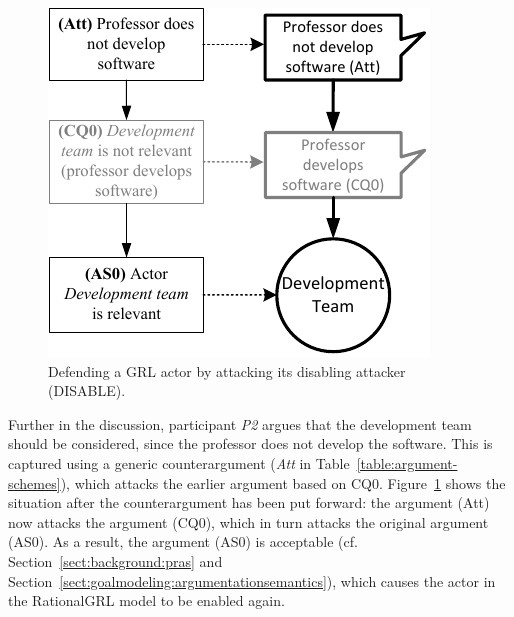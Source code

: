 \begin{figure}[b!]
\centering
\includegraphics[]{img/reinstate2.pdf}
\caption{Defending a GRL actor by attacking its disabling attacker (\textsf{DISABLE)}.}
\label{fig:examples:relevant-actor2}
\end{figure}

Further in the discussion, participant \emph{P2} argues that the development team should be considered, since the professor does not develop the software. This is captured using a generic counterargument (\emph{Att} in Table~\ref{table:argument-schemes}), which attacks the earlier argument based on CQ0. Figure~\ref{fig:examples:relevant-actor2} shows the situation after the counterargument has been put forward: the argument (Att) now attacks the argument (CQ0), which in turn attacks the original argument (AS0). As a result, the argument (AS0) is acceptable (cf. Section~\ref{sect:background:pras} and Section~\ref{sect:goalmodeling:argumentationsemantics}), which causes the actor in the RationalGRL model to be enabled again.


